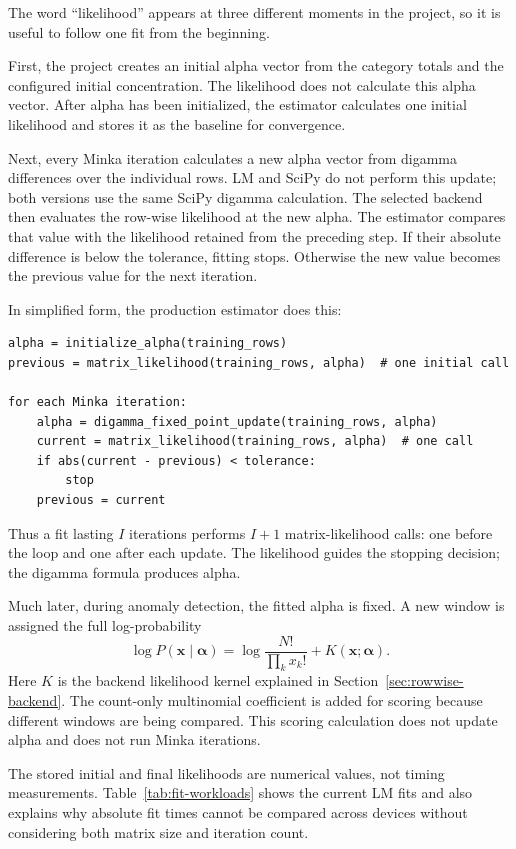 \documentclass[11pt]{article}
\begin{document}
The word ``likelihood'' appears at three different moments in the project, so
it is useful to follow one fit from the beginning.

First, the project creates an initial alpha vector from the category totals and
the configured initial concentration. The likelihood does not calculate this
alpha vector. After alpha has been initialized, the estimator calculates one
initial likelihood and stores it as the baseline for convergence.

Next, every Minka iteration calculates a new alpha vector from digamma
differences over the individual rows. LM and SciPy do not perform this update;
both versions use the same SciPy digamma calculation. The selected backend then
evaluates the row-wise likelihood at the new alpha. The estimator compares
that value with the likelihood retained from the preceding step. If their
absolute difference is below the tolerance, fitting stops. Otherwise the new
value becomes the previous value for the next iteration.

In simplified form, the production estimator does this:
\begin{verbatim}
alpha = initialize_alpha(training_rows)
previous = matrix_likelihood(training_rows, alpha)  # one initial call

for each Minka iteration:
    alpha = digamma_fixed_point_update(training_rows, alpha)
    current = matrix_likelihood(training_rows, alpha)  # one call
    if abs(current - previous) < tolerance:
        stop
    previous = current
\end{verbatim}

Thus a fit lasting \(I\) iterations performs \(I+1\) matrix-likelihood calls:
one before the loop and one after each update. The likelihood guides the
stopping decision; the digamma formula produces alpha.

Much later, during anomaly detection, the fitted alpha is fixed. A new window
is assigned the full log-probability
\[
  \log P(\mathbf{x}\mid\boldsymbol{\alpha})
  = \log\frac{N!}{\prod_k x_k!}
    + K(\mathbf{x};\boldsymbol{\alpha}).
\]
Here \(K\) is the backend likelihood kernel explained in
Section~\ref{sec:rowwise-backend}. The
count-only multinomial coefficient is added for scoring because different
windows are being compared. This scoring calculation does not update alpha and
does not run Minka iterations.

The stored initial and final likelihoods are numerical values, not timing
measurements. Table~\ref{tab:fit-workloads} shows the current LM fits and also
explains why absolute fit times cannot be compared across devices without
considering both matrix size and iteration count.
\end{document}
